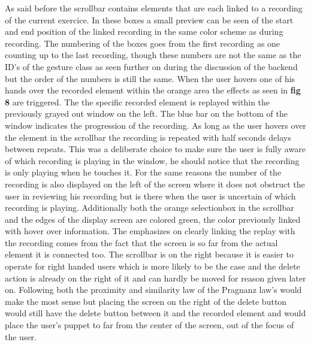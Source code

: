 As said before the scrollbar contains elements that are each linked to a recording of the current exercice. In these boxes a small preview can be seen of the start and end position of the linked recording in the same color scheme as during recording. The numbering of the boxes goes from the first recording as one counting up to the last recording, though these numbers are not the same as the ID's of the gesture class as seen further on during the discussion of the backend but the order of the numbers is still the same. When the user hovers one of his hands over the recorded element within the orange area the effects as seen in \textbf{ fig 8} are triggered. The the specific recorded element is replayed within the previously grayed out window on the left. The blue bar on the bottom of the window indicates the progression of the recording. As long as the user hovers over the element in the scrollbar the recording is repeated with half seconds delays between repeats. This was a deliberate choice to make sure the user is fully aware of which recording is playing in the window, he should notice that the recording is only playing when he touches it. For the same reasons the number of the recording is also displayed on the left of the screen where it does not obstruct the user in reviewing his recording but is there when the user is uncertain of which recording is playing. Additionally both the orange selectionbox in the scrollbar and the edges of the display screen are colored green, the color previously linked with hover over information. The emphasizes on clearly linking the replay with the recording comes from the fact that the screen is so far from the actual element it is connected too. The scrollbar is on the right because it is easier to operate for right handed users which is more likely to be the case and the delete action is already on the right of it and can hardly be moved for reason given later on. Following both the proximity and similarity law of the Pragnanz law's would make the most sense but placing the screen on the right of the delete button would still have the delete button between it and the recorded element and would place the user's puppet to far from the center of the screen, out of the focus of the user.\\

